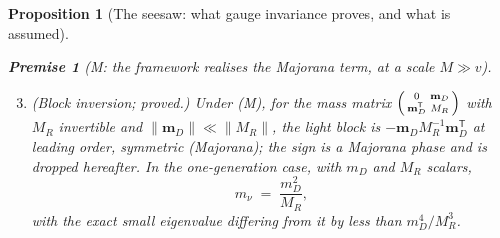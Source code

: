 \documentclass[11pt]{article}
\newtheorem{proposition}[theorem]{Proposition}
\theoremstyle{definition}
\newtheorem{premise}[theorem]{Premise}
\newcommand{\mD}{\mathbf{m}_{D}}
\begin{document}
\begin{proposition}[The seesaw: what gauge invariance proves, and what is assumed]
\begin{premise}[M: the framework realises the Majorana term, at a scale $M \gg v$]
\end{premise}
\begin{enumerate}
\setcounter{enumi}{2}
\item \emph{(Block inversion; proved.)} Under (M), for the mass matrix $\begin{psmallmatrix} 0 & \mD \\ \mD^{\mathsf{T}} & M_{R}\end{psmallmatrix}$ with $M_{R}$ invertible and $\|\mD\| \ll \|M_{R}\|$, the light block is $-\mD M_{R}^{-1}\mD^{\mathsf{T}}$ at leading order, symmetric (Majorana); the sign is a Majorana phase and is dropped hereafter. In the one-generation case, with $m_{D}$ and $M_{R}$ scalars,
\begin{equation}\label{eq:seesaw}
m_{\nu} \;=\; \frac{m_{D}^{2}}{M_{R}} ,
\end{equation}
with the exact small eigenvalue differing from it by less than $m_{D}^{4}/M_{R}^{3}$.
\end{enumerate}
\end{proposition}
\end{document}
